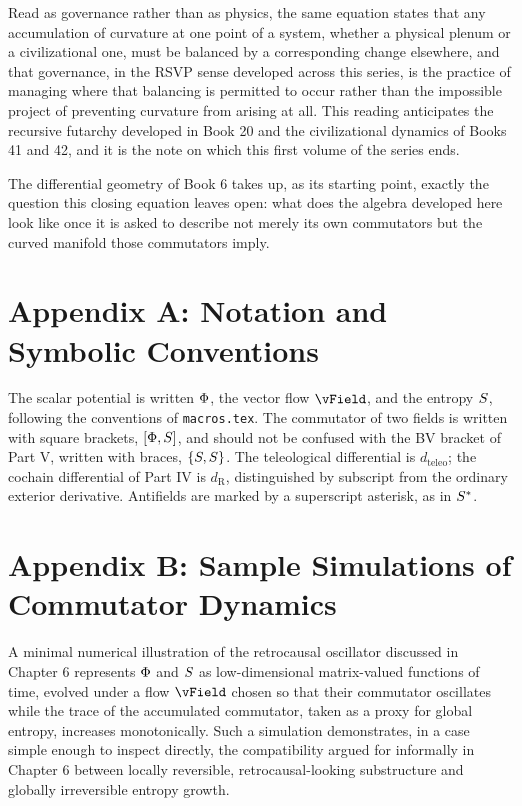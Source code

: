 Read as governance rather than as physics, the same equation states that any accumulation of curvature at one point of a system, whether a physical plenum or a civilizational one, must be balanced by a corresponding change elsewhere, and that governance, in the RSVP sense developed across this series, is the practice of managing where that balancing is permitted to occur rather than the impossible project of preventing curvature from arising at all. This reading anticipates the recursive futarchy developed in Book 20 and the civilizational dynamics of Books 41 and 42, and it is the note on which this first volume of the series ends.

The differential geometry of Book 6 takes up, as its starting point, exactly the question this closing equation leaves open: what does the algebra developed here look like once it is asked to describe not merely its own commutators but the curved manifold those commutators imply.

\chapter*{Appendix A: Notation and Symbolic Conventions}

The scalar potential is written $\Phi$, the vector flow $\vField$, and the entropy $S$, following the conventions of \texttt{macros.tex}. The commutator of two fields is written with square brackets, $[\Phi, S]$, and should not be confused with the BV bracket of Part V, written with braces, $\{S, S\}$. The teleological differential is $d_{\text{teleo}}$; the cochain differential of Part IV is $d_{\mathrm{R}}$, distinguished by subscript from the ordinary exterior derivative. Antifields are marked by a superscript asterisk, as in $S^{*}$.

\chapter*{Appendix B: Sample Simulations of Commutator Dynamics}

A minimal numerical illustration of the retrocausal oscillator discussed in Chapter 6 represents $\Phi$ and $S$ as low-dimensional matrix-valued functions of time, evolved under a flow $\vField$ chosen so that their commutator oscillates while the trace of the accumulated commutator, taken as a proxy for global entropy, increases monotonically. Such a simulation demonstrates, in a case simple enough to inspect directly, the compatibility argued for informally in Chapter 6 between locally reversible, retrocausal-looking substructure and globally irreversible entropy growth.

